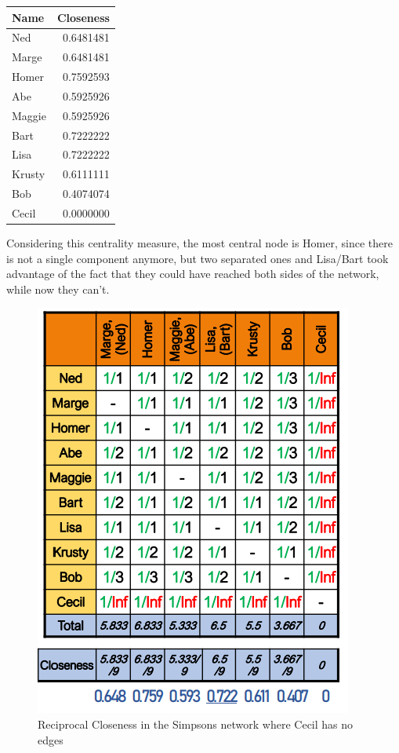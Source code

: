 \documentclass[
  notitlepage,
  onecolumn,
  openany]{book}
\begin{document}
\begin{table}
\centering
\begin{tabular}[t]{lr}
\toprule
Name & Closeness\\
\midrule
Ned & 0.6481481\\
Marge & 0.6481481\\
Homer & 0.7592593\\
Abe & 0.5925926\\
Maggie & 0.5925926\\
\addlinespace
Bart & 0.7222222\\
Lisa & 0.7222222\\
Krusty & 0.6111111\\
Bob & 0.4074074\\
Cecil & 0.0000000\\
\bottomrule
\end{tabular}
\end{table}

Considering this centrality measure, the most central node is Homer, since there is not a single component anymore, but two separated ones and Lisa/Bart took advantage of the fact that they could have reached both sides of the network, while now they can't.

\begin{figure}[h!]

{\centering \includegraphics[width=0.5\linewidth]{images/04-Centrality/Untitled 3} 

}

\caption{Reciprocal Closeness in the Simpsons network where Cecil has no edges}\label{fig:unnamed-chunk-19}
\end{figure}
\end{document}
